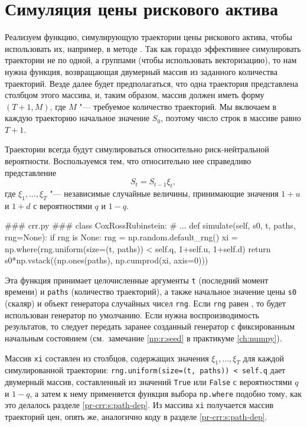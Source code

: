 \section{Симуляция цены рискового актива}
Реализуем функцию, симулирующую траектории цены рискового актива, чтобы использовать их, например, в методе \mc.
Так как гораздо эффективнее симулировать траектории не по одной, а группами (чтобы использовать векторизацию), то нам нужна функция, возвращающая двумерный массив из заданного количества траекторий.
Везде далее будет предполагаться, что одна траектория представлена столбцом этого массива, и, таким образом, массив должен иметь форму $(T+1, M)$, где $M$ "--- требуемое количество траекторий.
Мы включаем в каждую траекторию начальное значение $S_0$, поэтому число строк в массиве равно $T+1$.

Траектории всегда будут симулироваться относительно риск-нейтральной вероятности. 
Воспользуемся тем, что относительно нее справедливо представление
\[
S_t = S_{t-1}\xi_t,
\]
где $\xi_1,\dots,\xi_T$ "--- независимые случайные величины, принимающие значения $1+u$ и $1+d$ с вероятностями $q$ и $1-q$.

\begin{python}
### crr.py ###
class CoxRossRubinstein:
    # ...
    def simulate(self, s0, t, paths, rng=None):
        if rng is None:
            rng = np.random.default_rng()  
        xi = np.where(rng.uniform(size=(t, paths)) < self.q, 1+self.u, 1+self.d)
        return s0*np.vstack((np.ones(paths), np.cumprod(xi, axis=0)))
\end{python}
Эта функция принимает целочисленные аргументы \verb"t" (последний момент времени) и \verb"paths" (количество траекторий), а также начальное значение цены \verb"s0" (скаляр) и объект генератора случайных чисел \verb"rng".
Если \verb"rng" равен , то будет использован генератор по умолчанию.
Если нужна воспроизводимость результатов, то следует передать заранее созданный генератор с фиксированным начальным состоянием (см.~замечание \ref{np:r:seed} в практикуме \ref{ch:numpy}).

Массив \verb"xi" составлен из столбцов, содержащих значения $\xi_1,\dots,\xi_T$ для каждой симулированной траектории: \verb"rng.uniform(size=(t, paths)) < self.q" дает двумерный массив, составленный из значений \verb"True" или \verb"False" с вероятностями $q$ и $1-q$, а затем к нему применяется функция выбора \verb"np.where" подобно тому, как это делалось разделе \ref{pr-crr:s:path-dep}.
Из массива \verb"xi" получается массив траекторий цен, опять же, аналогично коду в разделе \ref{pr-crr:s:path-dep}.

